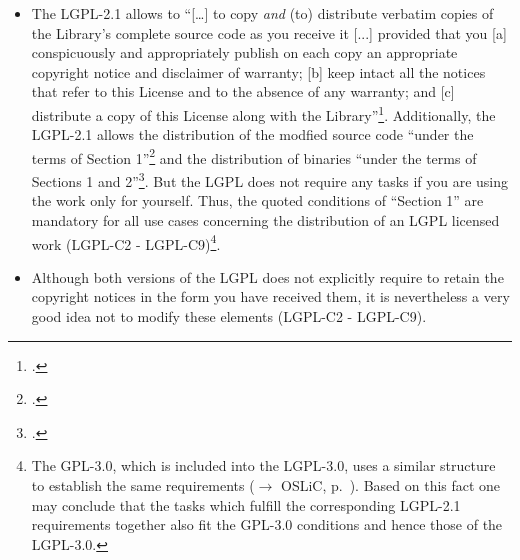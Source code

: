 \begin{itemize}
  
  \item The LGPL-2.1 allows to \enquote{[\ldots] to copy \emph{and} (to)
  distribute verbatim copies of the Library's complete source code as you
  receive it [...] provided that you [a] conspicuously and appropriately publish
  on each copy an appropriate copyright notice and disclaimer of warranty; [b]
  keep intact all the notices that refer to this License and to the absence of
  any warranty; and [c] distribute a copy of this License along with the
  Library}\footcite[cf.][\nopage wp.\ §1, emphasizes by
  KR]{Lgpl21OsiLicense1999a}. Additionally, the LGPL-2.1 allows the distribution
  of the modfied source code \enquote{under the terms of Section
  1}\footcite[cf.][\nopage wp.\ §2]{Lgpl21OsiLicense1999a} and the distribution
  of binaries \enquote{under the terms of Sections 1 and
  2}\footcite[cf.][\nopage wp.\ §4]{Lgpl21OsiLicense1999a}. But the LGPL does
  not require any tasks if you are using the work only for yourself. Thus, the
  quoted conditions of \enquote{Section 1} are mandatory for all use cases
  concerning the distribution of an LGPL licensed work (LGPL-C2 -
  LGPL-C9)\footnote{The GPL-3.0, which is included into the LGPL-3.0, uses a
  similar structure to establish the same requirements ($\rightarrow$ OSLiC, p.\
  \pageref{Gpl3ConditionsDistri}). Based on this fact one may conclude that the
  tasks which fulfill the corresponding LGPL-2.1 requirements together also fit
  the GPL-3.0 conditions and hence those of the LGPL-3.0.}.

  \item Although both versions of the LGPL does not explicitly require to retain
  the copyright notices in the form you have received them, it is nevertheless a
  very good idea not to modify these elements (LGPL-C2 - LGPL-C9).
  

\end{itemize}
